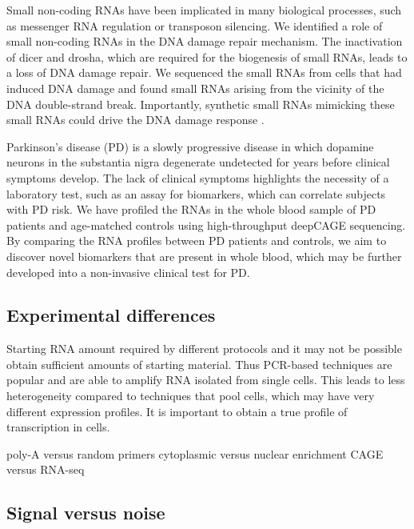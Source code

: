 \setlength{\parskip}{\baselineskip}%
\setlength{\parindent}{0pt}%

Small non-coding RNAs have been implicated in many biological processes, such as messenger RNA regulation or transposon silencing. We identified a role of small non-coding RNAs in the DNA damage repair mechanism. The inactivation of dicer and drosha, which are required for the biogenesis of small RNAs, leads to a loss of DNA damage repair. We sequenced the small RNAs from cells that had induced DNA damage and found small RNAs arising from the vicinity of the DNA double-strand break. Importantly, synthetic small RNAs mimicking these small RNAs could drive the DNA damage response \cite{francia2012site}.

Parkinson’s disease (PD) is a slowly progressive disease in which dopamine neurons in the substantia nigra degenerate undetected for years before clinical symptoms develop. The lack of clinical symptoms highlights the necessity of a laboratory test, such as an assay for biomarkers, which can correlate subjects with PD risk. We have profiled the RNAs in the whole blood sample of PD patients and age-matched controls using high-throughput deepCAGE sequencing. By comparing the RNA profiles between PD patients and controls, we aim to discover novel biomarkers that are present in whole blood, which may be further developed into a non-invasive clinical test for PD.

\subsection{Experimental differences}

Starting RNA amount required by different protocols and it may not be possible obtain sufficient amounts of starting material. Thus PCR-based techniques are popular and are able to amplify RNA isolated from single cells. This leads to less heterogeneity compared to techniques that pool cells, which may have very different expression profiles. It is important to obtain a true profile of transcription in cells.

poly-A versus random primers
cytoplasmic versus nuclear enrichment
CAGE versus RNA-seq

\subsection{Signal versus noise}

